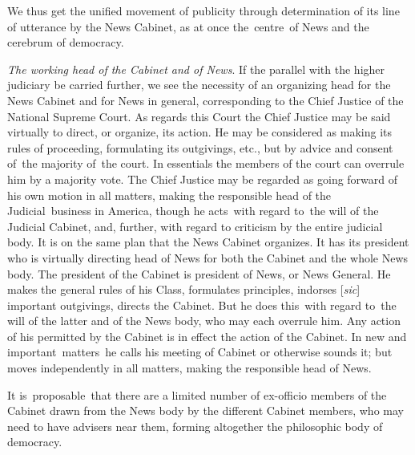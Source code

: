 \documentclass[twoside,symmetric,nobib,justified]{tufte-book}
\begin{document}
We thus get the unified movement of publicity through determination of
its line of utterance by the News Cabinet, as at once the~centre~of News
and the cerebrum of democracy.~

\vspace{0.05in}

\emph{The working head of the Cabinet and of News}. If the parallel with
the higher judiciary be carried further, we see the necessity of an
organizing head for the News Cabinet and for News in general,
corresponding to the Chief Justice of the National Supreme Court. As
regards this Court the Chief Justice may be said virtually to direct, or
organize, its action. He may be considered as making its rules of
proceeding, formulating its outgivings, etc., but by advice and consent
of~the majority of~the court. In essentials the members of the court can
overrule him by a majority vote. The Chief Justice may be regarded as
going forward of his own motion in all matters, making the responsible
head of the Judicial~business in America, though he acts~with regard
to~the will of the Judicial Cabinet, and, further, with regard to
criticism by the entire judicial body. It is on the same plan that the
News Cabinet organizes. It has its president who is virtually directing
head of News for both the Cabinet and the whole News body. The president
of the Cabinet is president of News, or News General. He makes the
general rules of his Class, formulates principles, indorses
{[}\emph{sic}{]} important outgivings, directs the Cabinet. But he does
this~with regard to~the will of the latter and of the News body, who may
each overrule him. Any action of his permitted by the Cabinet is in
effect the action of the Cabinet. In new and important~matters~he calls
his meeting of Cabinet or otherwise sounds it; but moves independently
in all matters, making the responsible head of News.~

It is~proposable~that there are a limited number of ex-officio members
of the Cabinet drawn from the News body by the different Cabinet
members, who may need to have advisers near them, forming altogether the
philosophic body of democracy.~

\vspace{0.05in}
\end{document}
